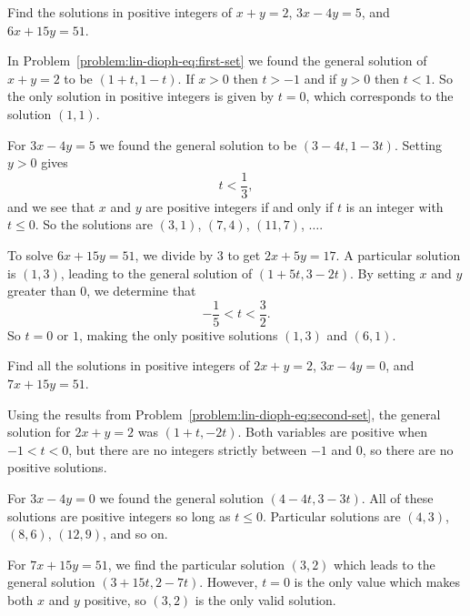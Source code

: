  Find the solutions in positive integers of $x + y = 2$,
$3x - 4y = 5$, and $6x + 15y = 51$.
\begin{solution}
  In Problem~\ref{problem:lin-dioph-eq:first-set} we found the general
  solution of $x + y = 2$ to be $(1+t,1-t)$. If $x > 0$ then $t > -1$
  and if $y > 0$ then $t < 1$. So the only solution in positive
  integers is given by $t = 0$, which corresponds to the solution
  $(1,1)$.

  For $3x - 4y = 5$ we found the general solution to be
  $(3 - 4t, 1 - 3t)$. Setting $y > 0$ gives
  \begin{equation*}
    t < \frac13,
  \end{equation*}
  and we see that $x$ and $y$ are positive integers if and only if $t$
  is an integer with $t\leq0$. So the solutions are $(3,1)$, $(7,4)$,
  $(11,7)$, $\dots$.

  To solve $6x + 15y = 51$, we divide by $3$ to get $2x + 5y = 17$. A
  particular solution is $(1,3)$, leading to the general solution of
  $(1+5t,3-2t)$. By setting $x$ and $y$ greater than $0$, we determine
  that
  \begin{equation*}
    -\frac15 < t < \frac32.
  \end{equation*}
  So $t = 0$ or $1$, making the only positive solutions $(1,3)$ and
  $(6,1)$.
\end{solution}

 Find all the solutions in positive integers of $2x + y = 2$,
$3x - 4y = 0$, and $7x + 15y = 51$.
\begin{solution}
  Using the results from
  Problem~\ref{problem:lin-dioph-eq:second-set}, the general solution
  for $2x + y = 2$ was $(1+t,-2t)$. Both variables are positive when
  $-1<t<0$, but there are no integers strictly between $-1$ and $0$,
  so there are no positive solutions.

  For $3x - 4y = 0$ we found the general solution $(4-4t,3-3t)$. All
  of these solutions are positive integers so long as
  $t\leq0$. Particular solutions are $(4,3)$, $(8,6)$, $(12,9)$, and
  so on.

  For $7x + 15y = 51$, we find the particular solution $(3,2)$ which
  leads to the general solution $(3+15t,2-7t)$. However, $t = 0$ is
  the only value which makes both $x$ and $y$ positive, so $(3,2)$ is
  the only valid solution.
\end{solution}

